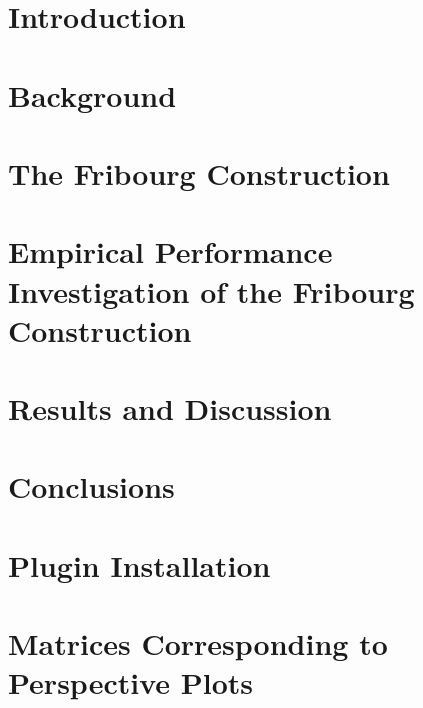 \documentclass[a4paper,table]{report}
\begin{document}
\dominitoc
\tableofcontents

\chapter{Introduction}
\label{chap_intro}
\minitoc
\newpage


\chapter{Background}
\label{chap_background}
\minitoc
\newpage


\chapter{The Fribourg Construction}
\label{chap_construction}
\minitoc
\newpage


\chapter{Empirical Performance Investigation of the Fribourg Construction}
\label{chap_investigation}
\minitoc
\newpage


\chapter{Results and Discussion}
\label{chap_results}
\minitoc
\newpage


\chapter{Conclusions}
\label{chap_conclusions}



\appendix
\chapter{Plugin Installation}
\label{app_plugin}


\chapter{Matrices Corresponding to Perspective Plots}
\label{app_matrices}

\end{document}
